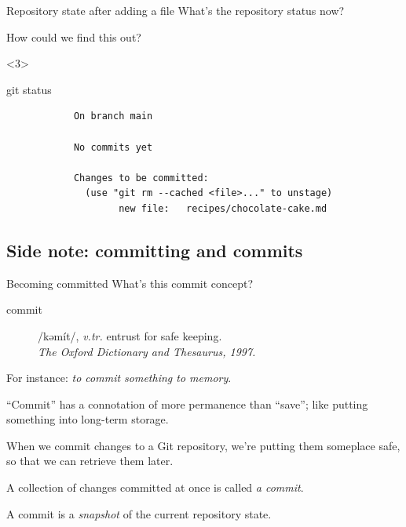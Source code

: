\begin{frame}[fragile]{Repository state after adding a file}
    What's the repository status now?

    How could we find this out?


    \begin{onlyenv}<3>
        \begin{shellcode}
            git status
        \end{shellcode}
        \begin{verbatim}
            On branch main

            No commits yet

            Changes to be committed:
              (use "git rm --cached <file>..." to unstage)
                    new file:   recipes/chocolate-cake.md
        \end{verbatim}
    \end{onlyenv}

\end{frame}

\subsection{Side note: committing and commits}

\begin{frame}[fragile]{Becoming committed}
    What's this commit concept?
    \begin{description}
        \item[commit] /kəmít/, \emph{v.tr.} entrust for safe
            keeping.\\
            \emph{The Oxford Dictionary and Thesaurus, 1997.}
    \end{description}

    For instance: \emph{to commit something to memory}.

    ``Commit'' has a connotation of more permanence than ``save''; like
    putting something into long-term storage.

    When we commit changes to a Git repository, we're putting them someplace
    safe, so that we can retrieve them later.

    A collection of changes committed at once is called \emph{a commit}.

    A commit is a \emph{snapshot} of the current repository state.
\end{frame}


